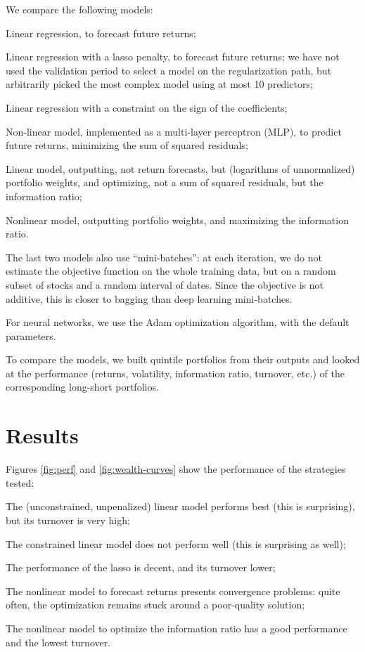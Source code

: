 \documentclass[12pt]{article}
\begin{document}
We compare the following models: 
\begin{compactitem}[--]
\item Linear regression, to forecast future returns;
\item Linear regression with a lasso penalty, to forecast future returns; 
  we have not used the validation period to select a model on the regularization path, 
  but arbitrarily picked the most complex model using at most 10 predictors;
\item Linear regression with a constraint on the sign of the coefficients; 
\item Non-linear model, implemented as a multi-layer perceptron (MLP), 
  to predict future returns, minimizing the sum of squared residuals; 
\item Linear model, outputting, not return forecasts, but (logarithms of unnormalized) 
  portfolio weights, and optimizing, not a sum of squared residuals, 
  but the information ratio; 
\item Nonlinear model, outputting portfolio weights, and maximizing the information ratio.
\end{compactitem}

The last two models also use ``mini-batches'': 
at each iteration, we do not estimate the objective function on the whole training data,
but on a random subset of stocks and a random interval of dates. Since the objective is not additive,
this is closer to bagging than deep learning mini-batches.

For neural networks, we use the Adam optimization algorithm, with the default parameters.

To compare the models, we built quintile portfolios from their outputs
and looked at the performance (returns, volatility, information ratio, turnover, etc.) 
of the corresponding long-short portfolios. 

\clearpage
\section{Results}

Figures \ref{fig:perf} and \ref{fig:wealth-curves} show the performance of the strategies tested:
\begin{compactitem}[--]
\item The (unconstrained, unpenalized) linear model performs best
  (this is surprising),
  but its turnover is very high;
\item The constrained linear model does not perform well 
  (this is surprising as well);
\item The performance of the lasso is decent, 
  and its turnover lower;
\item The nonlinear model to forecast returns presents convergence problems: 
  quite often, the optimization remains stuck around a poor-quality solution;
\item The nonlinear model to optimize the information ratio has 
  a good performance and the lowest turnover. 
\end{compactitem}
\end{document}
